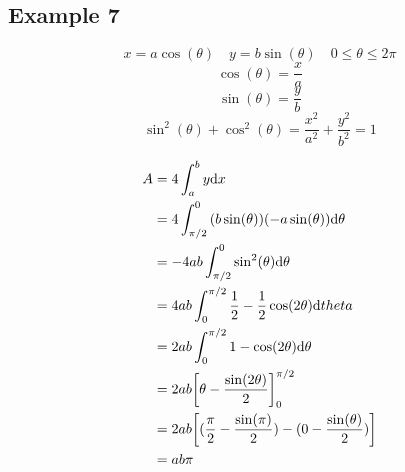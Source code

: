 \documentclass{math}
\begin{document}
\subsection*{Example 7}
\[ x = a\cos(\theta) \quad y = b\sin(\theta) \quad 0 \leq \theta \leq 2\pi \]
\[ \cos(\theta) = \frac{x}{a} \]
\[ \sin(\theta) = \frac{y}{b} \]
\[ \sin^{2}(\theta)+\cos^{2}(\theta) =
   \frac{x^{2}}{a^{2}}+\frac{y^{2}}{b^{2}} = 1 \]
\begin{center}
\end{center}
\begin{align*}
  A &= 4\int_{a}^{b}{y\mathrm{d}{x}} \\
  &= 4\int_{\pi/2}^{0}{(b\sin(\theta))(-a\sin(\theta))\mathrm{d}{\theta}} \\
  &= -4ab\int_{\pi/2}^{0}{\sin^{2}(\theta)\mathrm{d}{\theta}} \\
  &= 4ab\int_{0}^{\pi/2}{\frac{1}{2}-\frac{1}{2}\cos(2\theta)\mathrm{d}{theta}} \\
  &= 2ab\int_{0}^{\pi/2}{1-\cos(2\theta)\mathrm{d}{\theta}} \\
  &= 2ab\bigg[\theta-\frac{\sin(2\theta)}{2}\bigg]_{0}^{\pi/2} \\
  &= 2ab\bigg[(\frac{\pi}{2}-\frac{\sin(\pi)}{2})-
    (0-\frac{\sin(\theta)}{2})\bigg] \\
  &= ab\pi
\end{align*}
\end{document}

